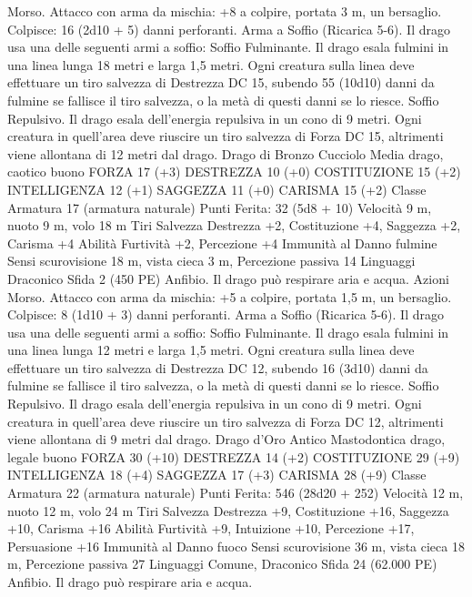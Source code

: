 \begin{multicols}{2}
Morso. Attacco con arma da mischia: +8 a colpire, portata 3 m,
un bersaglio.
Colpisce: 16 (2d10 + 5) danni perforanti.
Arma a Soffio (Ricarica 5-6). Il drago usa una delle seguenti armi
a soffio:
Soffio Fulminante. Il drago esala fulmini in una linea lunga 18 metri
e larga 1,5 metri. Ogni creatura sulla linea deve effettuare un tiro
salvezza di Destrezza DC 15, subendo 55 (10d10) danni da fulmine
se fallisce il tiro salvezza, o la metà di questi danni se lo riesce.
Soffio Repulsivo. Il drago esala dell’energia repulsiva in un cono di 9
metri. Ogni creatura in quell’area deve riuscire un tiro salvezza di
Forza DC 15, altrimenti viene allontana di 12 metri dal drago.
Drago di Bronzo Cucciolo
Media drago, caotico buono
FORZA 17 (+3)
DESTREZZA 10 (+0)
COSTITUZIONE 15 (+2)
INTELLIGENZA 12 (+1)
SAGGEZZA 11 (+0)
CARISMA 15 (+2)
Classe Armatura 17 (armatura naturale)
\hspace*{0pt}\hfill{Punti Ferita}: 32 (5d8 + 10)
Velocità 9 m, nuoto 9 m, volo 18 m
Tiri Salvezza Destrezza +2, Costituzione +4, Saggezza +2,
Carisma +4
Abilità Furtività +2, Percezione +4
Immunità al Danno fulmine
Sensi scurovisione 18 m, vista cieca 3 m, Percezione passiva 14
Linguaggi Draconico
Sfida 2 (450 PE)
Anfibio. Il drago può respirare aria e acqua.
Azioni
Morso. Attacco con arma da mischia: +5 a colpire, portata 1,5
m, un bersaglio.
Colpisce: 8 (1d10 + 3) danni perforanti.
Arma a Soffio (Ricarica 5-6). Il drago usa una delle seguenti armi
a soffio:
Soffio Fulminante. Il drago esala fulmini in una linea lunga 12 metri
e larga 1,5 metri. Ogni creatura sulla linea deve effettuare un tiro
salvezza di Destrezza DC 12, subendo 16 (3d10) danni da fulmine se
fallisce il tiro salvezza, o la metà di questi danni se lo riesce.
Soffio Repulsivo. Il drago esala dell’energia repulsiva in un cono di 9
metri. Ogni creatura in quell’area deve riuscire un tiro salvezza di
Forza DC 12, altrimenti viene allontana di 9 metri dal drago.
Drago d’Oro Antico
Mastodontica drago, legale buono
FORZA 30 (+10)
DESTREZZA 14 (+2)
COSTITUZIONE 29 (+9)
INTELLIGENZA 18 (+4)
SAGGEZZA 17 (+3)
CARISMA 28 (+9)
Classe Armatura 22 (armatura naturale)
\hspace*{0pt}\hfill{Punti Ferita}: 546 (28d20 + 252)
Velocità 12 m, nuoto 12 m, volo 24 m
Tiri Salvezza Destrezza +9, Costituzione +16, Saggezza +10,
Carisma +16
Abilità Furtività +9, Intuizione +10, Percezione +17, Persuasione +16
Immunità al Danno fuoco
Sensi scurovisione 36 m, vista cieca 18 m, Percezione passiva 27
Linguaggi Comune, Draconico
Sfida 24 (62.000 PE)
Anfibio. Il drago può respirare aria e acqua.

\end{multicols}
